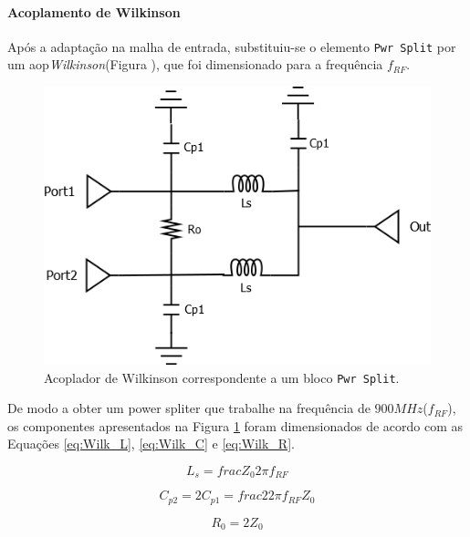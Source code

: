 \documentclass[11pt]{article}
\numberwithin{equation}{section}
\begin{document}
\paragraph{Acoplamento de Wilkinson} \hspace{0pt} 

Após a adaptação na malha de entrada, substituiu-se o elemento \texttt{Pwr Split} por um aop\textit{Wilkinson}(Figura ), que foi dimensionado para a frequência $ f_{RF} $.

\begin{figure}[h]
\centering
\includegraphics[keepaspectratio=true, scale=0.45]{teoricas/Wilkinson}
\vspace{-0.5em}
\caption{Acoplador de Wilkinson correspondente a um bloco \texttt{Pwr Split}.}
\vspace{-0.8em}
\label{fig:Wilk}
\end{figure}


De modo a obter um power spliter que trabalhe na frequência de $900MHz$($ f_{RF} $), os componentes apresentados na Figura \ref{fig:Wilk} foram dimensionados de acordo com as Equações \ref{eq:Wilk_L}, \ref{eq:Wilk_C} e \ref{eq:Wilk_R}. 

\begin{equation}
L_{s}=frac{Z_{0}}{2 \pi f_{RF}}
\label{eq:Wilk_L}
\end{equation}

\begin{equation}
C_{p2}=2C_{p1}=frac{2}{2 \pi f_{RF}Z_{0}}
\label{eq:Wilk_C}
\end{equation}

\begin{equation}
R_{0}=2Z_{0}
\label{eq:Wilk_R}
\end{equation}
\end{document}
